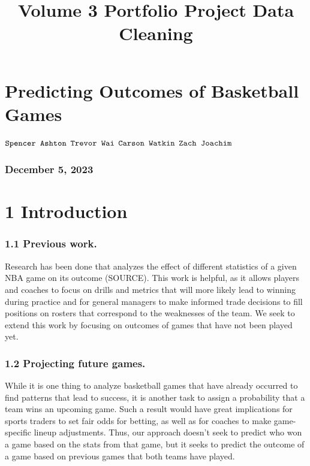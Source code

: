 \documentclass[11pt]{article}
\title{Volume 3 Portfolio Project Data Cleaning}
\begin{document}
    
    \maketitle
    
    

    
    \section{Predicting Outcomes of Basketball
Games}\label{predicting-outcomes-of-basketball-games}

\(\texttt{Spencer Ashton}\\\) \(\texttt{Trevor Wai}\\\)
\(\texttt{Carson Watkin}\\\) \(\texttt{Zach Joachim}\\\)

\subsubsection{December 5, 2023}\label{december-5-2023}

    \section{\texorpdfstring{\textbf{1
Introduction}}{1 Introduction}}\label{introduction}

\subsubsection{1.1 Previous work.}\label{previous-work.}

Research has been done that analyzes the effect of different statistics
of a given NBA game on its outcome (SOURCE). This work is helpful, as it
allows players and coaches to focus on drills and metrics that will more
likely lead to winning during practice and for general managers to make
informed trade decisions to fill positions on rosters that correspond to
the weaknesses of the team. We seek to extend this work by focusing on
outcomes of games that have not been played yet.

\subsubsection{1.2 Projecting future
games.}\label{projecting-future-games.}

While it is one thing to analyze basketball games that have already
occurred to find patterns that lead to success, it is another task to
assign a probability that a team wins an upcoming game. Such a result
would have great implications for sports traders to set fair odds for
betting, as well as for coaches to make game-specific lineup
adjustments. Thus, our approach doesn't seek to predict who won a game
based on the stats from that game, but it seeks to predict the outcome
of a game based on previous games that both teams have played.
\end{document}
